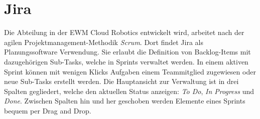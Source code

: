 \section{Jira}
Die Abteilung in der \ac{EWM} Cloud Robotics entwickelt wird, arbeitet nach der agilen Projektmanagement-Methodik \emph{Scrum}.
Dort findet Jira als Planungssoftware Verwendung.
Sie erlaubt die Definition von Backlog-Items mit dazugehörigen Sub-Tasks, welche in Sprints verwaltet werden.
In einem aktiven Sprint können mit wenigen Klicks Aufgaben einem Teammitglied zugewiesen oder neue Sub-Tasks erstellt werden.
Die Hauptansicht zur Verwaltung ist in drei Spalten gegliedert, welche den aktuellen Status anzeigen: \emph{To Do}, \emph{In Progress} und \emph{Done}.
Zwischen Spalten hin und her geschoben werden Elemente eines Sprints bequem per Drag and Drop.